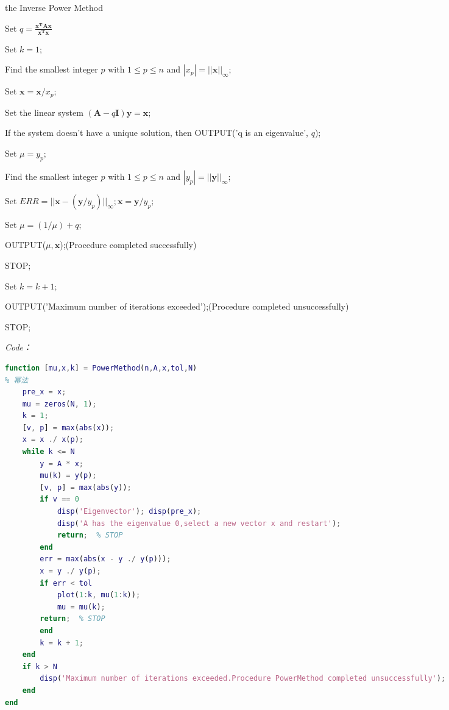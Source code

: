 \documentclass[12pt]{ctexart}
\begin{document}
	\begin{algorithm}
		\caption{the Inverse Power Method}
		Set $q=\frac{\mathbf{x^TAx}}{\mathbf{x^Tx}}$
		
		Set $k=1;$
		
		Find the smallest integer $p$ with $1\leq p\leq n$ and $|x_p|=||\mathbf{x}||_\infty$;
		
		Set $\mathbf{x}=\mathbf{x}/x_p;$
		
		{
			Set the linear system $(\mathbf{A}-q\mathbf{I})\mathbf{y}=\mathbf{x}$;
			
			If the system doesn't have a unique solution, then OUTPUT('q is an eigenvalue', $q$);
			
			Set $\mu=y_p;$
			
			Find the smallest integer $p$ with $1\leq p\leq n$ and $|y_p|=||\mathbf{y}||_\infty$;
			
			Set $ERR=||\mathbf{x}-(\mathbf{y}/y_p)||_\infty; \mathbf{x}=\mathbf{y}/y_p;$
			
			{
				Set $\mu=(1/\mu)+q;$
				
				OUTPUT($\mu,\mathbf{x}$);(Procedure completed successfully)
				
				STOP;
			}
			
			Set $k=k+1$;
		}
		
		OUTPUT('Maximum number of iterations exceeded');(Procedure completed unsuccessfully)
		
		STOP;
	\end{algorithm}

	\textit{Code：}
	
\begin{lstlisting}[language = MATLAB]
function [mu,x,k] = PowerMethod(n,A,x,tol,N)
% 幂法
	pre_x = x;
	mu = zeros(N, 1);
	k = 1;
	[v, p] = max(abs(x));
	x = x ./ x(p);
	while k <= N
		y = A * x;
		mu(k) = y(p);
		[v, p] = max(abs(y));
		if v == 0
			disp('Eigenvector'); disp(pre_x);
			disp('A has the eigenvalue 0,select a new vector x and restart');
			return;  % STOP
		end
		err = max(abs(x - y ./ y(p)));
		x = y ./ y(p);
		if err < tol
			plot(1:k, mu(1:k));
			mu = mu(k);
		return;  % STOP
		end
		k = k + 1;
	end
	if k > N
		disp('Maximum number of iterations exceeded.Procedure PowerMethod completed unsuccessfully');
	end
end
\end{lstlisting}
\end{document}

